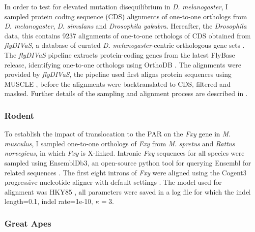In order to test for elevated mutation disequilibrium in \textit{D. melanogaster}, I sampled protein coding sequence (CDS) alignments of one-to-one orthologs from \textit{D. melanogaster}, \textit{D. simulans} and \textit{Drosophila yakubra}. Hereafter, the \textit{Drosophila} data, this contains 9237 alignments of one-to-one orthologs of CDS obtained from \textit{flyDIVaS}, a database of curated \textit{D. melanogaster}-centric orthologous gene sets \citep{Stanley2016FlyDIVaS:Selection, Clark2007EvolutionPhylogeny}. The \textit{flyDIVaS} pipeline extracts protein-coding genes from the latest FlyBase release, identifying one-to-one orthologs using OrthoDB \citep{Zdobnov2021OrthoDBOrthologs}. The alignments were provided by \textit{flyDIVaS}, the pipeline used first aligns protein sequences using MUSCLE \citep{Edgar2004MUSCLE:Complexity}, before the alignments were backtranslated to CDS, filtered and masked. Further details of the sampling and alignment process are described in \citep{Stanley2016FlyDIVaS:Selection}. 

\subsubsection{Rodent}

To establish the impact of translocation to the PAR on the \textit{Fxy} gene in \textit{M. musculus}, I sampled one-to-one orthologs of \textit{Fxy} from \textit{M. spretus} and \textit{Rattus norvegicus}, in which \textit{Fxy} is X-linked. Intronic \textit{Fxy} sequences for all species were sampled using EnsemblDb3, an open-source python tool for querying Ensembl for related sequences \citep{HuttleyEnsembldb3}. The first eight introns of \textit{Fxy} were aligned using the Cogent3 progressive nucleotide aligner with default settings \citep{Knight2007PyCogent:Sequence}. The model used for alignment was HKY85 \citep{Hasegawa1985DatingDNA}, all parameters were saved in a log file for which the indel length=0.1, indel rate=1e-10, $\kappa=3$. 

\subsubsection{Great Apes}


